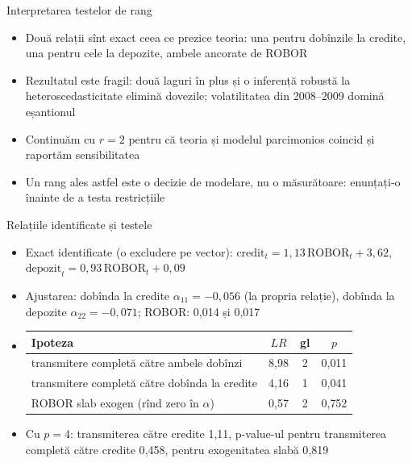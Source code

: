 \begin{frame}{Interpretarea testelor de rang}
\itemsize{\small}
\begin{itemize}
    \item Două relații sînt exact ceea ce prezice teoria: una pentru dobînzile la credite, una pentru cele la depozite, ambele ancorate de ROBOR
    \item Rezultatul este fragil: două laguri în plus și o inferență robustă la heteroscedasticitate elimină dovezile; volatilitatea din 2008--2009 domină eșantionul
    \item Continuăm cu $r = 2$ pentru că teoria și modelul parcimonios coincid și raportăm sensibilitatea
    \item Un rang ales astfel este o decizie de modelare, nu o măsurătoare: enunțați-o înainte de a testa restricțiile
\end{itemize}
\end{frame}

\begin{frame}{Relațiile identificate și testele}
\itemsize{\small}
\begin{itemize}
    \item Exact identificate (o excludere pe vector): $\text{credit}_t = 1{,}13\,\text{ROBOR}_t + 3{,}62$, $\text{depozit}_t = 0{,}93\,\text{ROBOR}_t + 0{,}09$
    \item Ajustarea: dobînda la credite $\alpha_{11} = \ensuremath{-}0{,}056$ (la propria relație), dobînda la depozite $\alpha_{22} = \ensuremath{-}0{,}071$; ROBOR: 0{,}014 și 0{,}017
    \item \begin{center}
\scriptsize
\begin{tabular}{lccc}
\toprule
\textbf{Ipoteza} & $LR$ & gl & $p$ \\
\midrule
transmitere completă către ambele dobînzi & 8{,}98 & 2 & 0{,}011 \\
transmitere completă către dobînda la credite & 4{,}16 & 1 & 0{,}041 \\
ROBOR slab exogen (rînd zero în $\alpha$) & 0{,}57 & 2 & 0{,}752 \\
\bottomrule
\end{tabular}
\end{center}

    \item Cu $p = 4$: transmiterea către credite 1{,}11, p-value-ul pentru transmiterea completă către credite 0{,}458, pentru exogenitatea slabă 0{,}819
\end{itemize}
\end{frame}

